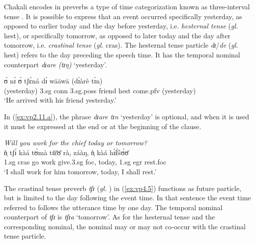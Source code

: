 \begin{exe}
\begin{exe}
\begin{exe}
{\begin{exe}
\begin{exe}
\begin{exe}
\begin{exe}
\begin{exe}
\begin{exe}
\begin{exe}
\begin{xlist}
\begin{exe}
\begin{exe}
\begin{exe}
\begin{exe}
\begin{exe}
\begin{exe}
\begin{exe}
\begin{exe}
\begin{exe}
\begin{exe}
\begin{exe}
\begin{exe}
\begin{exe}
\begin{exe}
Chakali encodes  in  preverbs  a type of time categorization  known as 
three-interval tense  \citep[366]{Fraw92}. It is possible to express that an 
event occurred specifically yesterday, as opposed to earlier today and the day 
before yesterday, i.e. {\it hesternal tense} ({\it gl.} {\sc hest}), or 
specifically tomorrow, as opposed to later today and the day after tomorrow, 
i.e. {\it crastinal tense}  ({\it gl.}  {\sc cras}). The hesternal tense 
particle {\it dɪ}/{\it de} ({\it gl.} {\sc hest})  refers to the day preceding 
the speech time.  It has the temporal nominal  counterpart  {\it dɪare (tɪŋ)} 
`yesterday'.  



\ea\label{ex:vp2.11.a} 
 ʊ̀ nɪ́ ʊ̀ tʃɛ̀ná dɪ́ wāāwā  {(dɪ̀àrè tɪ̀n)}\\
{(yesterday)}    {\sc 3.sg} {\sc conn} {\sc 3.sg.poss} friend
{\sc hest}  come.{\sc pfv} {(yesterday)} \\ 
\glt  `He arrived with his friend yesterday.'
 \z



In (\ref{ex:vp2.11.a}),  the  phrase {\it dɪare 
tɪn} `yesterday' is optional,  and  when it is used it must be expressed at the 
end or at the beginning of the clause.


\ea\label{ex:vp4.5} {\it Will you work for the chief today or tomorrow?}\\
\gll  ǹ̩ tʃɪ́ kàá tʊ̀mà tɪ̄ɛ̄ʊ̄ rà, záàŋ,  ǹ̩ kàá hɪ̃̀ɛ̃̀sʊ̀ʊ̄ \\
    {\sc 1.sg} {\sc cras}  go  work give.{\sc 3.sg} {\sc foc},
today,   {\sc 1.sg}  {\sc egr} rest.{\sc foc} \\
\glt  `I shall work for
him tomorrow, today,  I shall rest.' 
 \z

The crastinal tense preverb {\it tʃɪ} ({\it gl.} {\cras})  in  (\ref{ex:vp4.5})
functions as future particle,  but is limited to the day following the event
time.
In that sentence the event time referred to follows  the utterance
time by one day.  The temporal nominal counterpart  of {\it tʃɪ} is {\it  tʃɪa} 
`tomorrow'. As
for the hesternal tense and the corresponding nominal,  the  nominal may or
may not co-occur with the crastinal tense particle. 





\end{exe}
\end{exe}
\end{exe}
\end{exe}
\end{exe}
\end{exe}
\end{exe}
\end{exe}
\end{exe}
\end{exe}
\end{exe}
\end{exe}
\end{exe}
\end{exe}
\end{xlist}
\end{exe}
\end{exe}
\end{exe}
\end{exe}
\end{exe}
\end{exe}
\end{exe}}
\end{exe}
\end{exe}
\end{exe}
